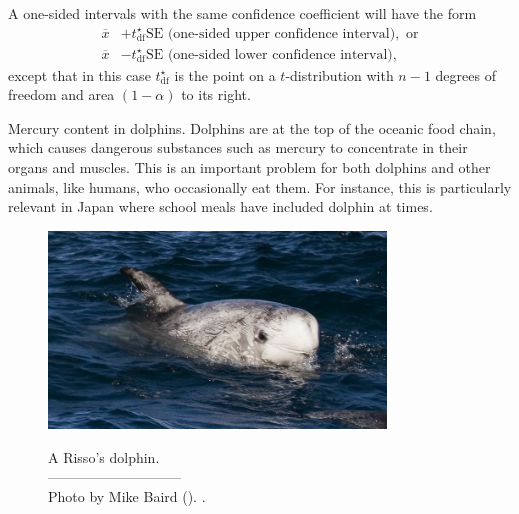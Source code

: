 A one-sided intervals with the same confidence coefficient will have the form  
\begin{align*}
    \overline{x} &+ t_{\text{df}}^{\star}\text{SE} \text{   (one-sided upper confidence interval)}, \text{  or} \\
    \overline{x} &- t_{\text{df}}^{\star}\text{SE} \text{   (one-sided lower confidence interval)},
\end{align*}
except that in this case $t_{\text{df}}^{\star}$ is the point on a $t$-distribution with $n-1$ degrees of freedom and  area $(1 - \alpha)$ to its right.

\begin{example}{Mercury content in dolphins.}
Dolphins are at the top of the oceanic food chain, which causes dangerous substances such as mercury to concentrate in their organs and muscles. This is an important problem for both dolphins and other animals, like humans, who occasionally eat them. For instance, this is particularly relevant in Japan where school meals have included dolphin at times.
\setlength{\captionwidth}{86mm}

\begin{figure}[h]
\centering
\includegraphics[width=0.8\textwidth]{ch_inference_for_means_oi_biostat/figures/rissosDolphin/rissosDolphin.jpg}  \\
\addvspace{2mm}
\begin{minipage}{\textwidth}
   \caption[rissosDolphinPic]{A Risso's dolphin.\vspace{-1mm} \\
   -----------------------------\vspace{-2mm}\\
   {\footnotesize Photo by Mike Baird (). .}\vspace{-8mm}}
   \label{rissosDolphin}
\end{minipage}
\vspace{3mm}
\end{figure}
\setlength{\captionwidth}{\mycaptionwidth}


\end{example}

